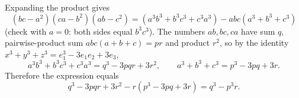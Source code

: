 Expanding the product gives
\[\left(bc-a^2\right)\left(ca-b^2\right)\left(ab-c^2\right)=\left(a^3b^3+b^3c^3+c^3a^3\right)-abc\left(a^3+b^3+c^3\right)\]
(check with $a=0$: both sides equal $b^3c^3$). The numbers $ab,bc,ca$ have sum $q$, pairwise-product sum $abc(a+b+c)=pr$ and product $r^2$, so by the identity $x^3+y^3+z^3=e_1^3-3e_1e_2+3e_3$,
\[a^3b^3+b^3c^3+c^3a^3=q^3-3pqr+3r^2,\qquad a^3+b^3+c^3=p^3-3pq+3r.\]
Therefore the expression equals
\[q^3-3pqr+3r^2-r\left(p^3-3pq+3r\right)=\boxed{q^3-p^3r}.\]
